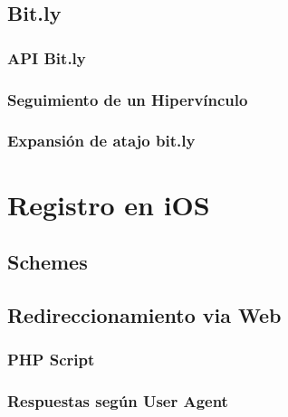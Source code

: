 	\subsection{Bit.ly}
		\subsubsection{API Bit.ly}
		\subsubsection{Seguimiento de un Hipervínculo}
		\subsubsection{Expansión de atajo bit.ly}
\clearpage
\section{Registro en iOS}
	\subsection{Schemes}
	\subsection{Redireccionamiento via Web}
		\subsubsection{PHP Script}
		\subsubsection{Respuestas según User Agent}